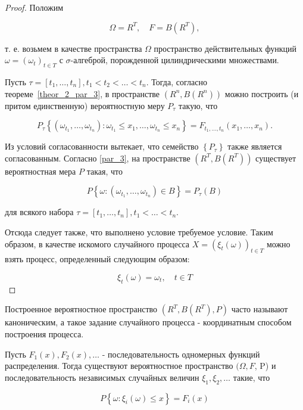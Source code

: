\begin{proof} Положим

$$
\Omega=R^{T}, \quad {F}={B}\left(R^{T}\right),
$$

т. е. возьмем в качестве пространства $\Omega$ пространство действительных функций $\omega=\left(\omega_{t}\right)_{t \in T}$ с $\sigma$-алгеброй, порожденной цилиндрическими множествами.

Пусть $\tau=\left[t_{1}, \ldots, t_{n}\right], t_{1}<t_{2}<\ldots<t_{n}$. Тогда, согласно теореме~\ref{theor_2_par_3}, в пространстве $\left(R^{n}, {B}\left(R^{n}\right)\right)$ можно построить (и притом единственную) вероятностную меру $P_{\tau}$ такую, что

$$
P_{\tau}\left\{\left(\omega_{t_{1}}, \ldots, \omega_{t_{n}}\right): \omega_{t_{1}} \leqslant x_{1}, \ldots, \omega_{t_{n}} \leqslant x_{n}\right\}=F_{t_{1}, \ldots, t_{n}}\left(x_{1}, \ldots, x_{n}\right) .
$$

Из условий согласованности вытекает, что семейство $\left\{P_{\tau}\right\}$ также является согласованным. Согласно \ref{par_3}, на пространстве $\left(R^{T}, {B}\left(R^{T}\right)\right)$ существует вероятностная мера ${P}$ такая, что

$$
{P}\left\{\omega:\left(\omega_{t_{1}}, \ldots, \omega_{t_{n}}\right) \in B\right\}=P_{\tau}(B)
$$

для всякого набора $\tau=\left[t_{1}, \ldots, t_{n}\right], t_{1}<\ldots<t_{n}$.

Отсюда следует также, что выполнено условие требуемое условие. Таким образом, в качестве искомого случайного процесса $X=\left(\xi_{t}(\omega)\right)_{t \in T}$ можно взять процесс, определенный следующим образом:

$$
\xi_{t}(\omega)=\omega_{t}, \quad t \in T
$$
\end{proof}

\begin{remark}
Построенное вероятностное пространство $\left(R^{T}, {B}\left(R^{T}\right), {P}\right)$ часто называют каноническим, а такое задание случайного процесса - координатным способом построения процесса.
\end{remark}

\begin{corollary} Пусть $F_{1}(x), F_{2}(x), \ldots$ - последовательность одномерных функций распределения. Тогда существуют вероятностное пространство $(\Omega, {F}$, P) и последовательность независимых случайных величин $\xi_{1}, \xi_{2}, \ldots$ такие, что

$$
{P}\left\{\omega: \xi_{i}(\omega) \leqslant x\right\}=F_{i}(x)
$$
\end{corollary}

